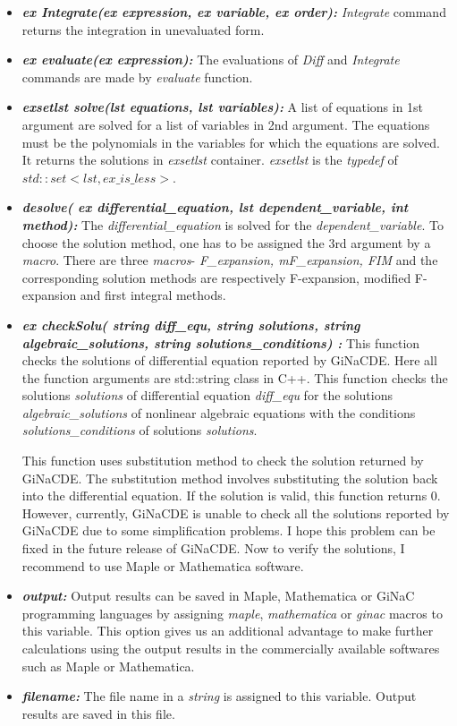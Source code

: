 \documentclass[prd,aps,floats,showkeys,nofootinbib,notitlepage]{revtex4-2}
\begin{document}
\begin{itemize}
		\item[] {\em \textbf{ex Integrate(ex expression, ex variable, ex order):}} {\em Integrate} command returns the integration in unevaluated form.
		
		\item[] {\em \textbf{ex evaluate(ex expression):}} The evaluations of {\em Diff} and {\em Integrate} commands are made by {\em evaluate} function.
		
		\item[] {\em \textbf{exsetlst solve(lst equations, lst variables):}} A list of equations in 1st argument are solved for a list of variables in 2nd argument. The equations must be the polynomials in the variables for which the equations are solved. It returns the solutions in {\em exsetlst} container. {\em exsetlst} is the {\em typedef} of ${ std::set< lst,ex\_is\_less>}$.  
		
		\item[] {\em \textbf{desolve( ex differential\_equation, lst dependent\_variable, int method):}} The {\em differential\_equation} is solved for the {\em dependent\_variable}. To choose the solution method, one has to be assigned the 3rd argument by a {\em macro}. There are three {\em macros}- {\em F\_expansion, mF\_expansion, FIM} and the corresponding solution methods are respectively F-expansion, modified F-expansion and first integral methods. 
		
		\item[] {\em \textbf{ex checkSolu( string diff\_equ, string solutions, string algebraic\_solutions, string solutions\_conditions)
		:}}  This function checks the solutions of differential equation reported by GiNaCDE. Here all the function arguments are std::string class in C++. This function checks the solutions \textit{solutions} of differential equation \textit{diff\_equ} for the solutions \textit{algebraic\_solutions} of nonlinear algebraic equations with the conditions \textit{solutions\_conditions} of solutions \textit{solutions}.
	
	   This function uses substitution method to check the solution returned by GiNaCDE. The substitution method involves substituting the solution back into the differential equation. If the solution is valid, this function returns $0$. However, currently, GiNaCDE is unable to check all the solutions reported by GiNaCDE due to some simplification problems. I hope this problem can be fixed in the future release of GiNaCDE. Now to verify the solutions, I recommend to use Maple or Mathematica software.
		
		\item[] {\em \textbf{output:}} Output results can be saved in Maple, Mathematica or GiNaC programming languages by assigning {\em maple}, {\em mathematica}
		 or {\em ginac} {macros} to this variable. This option gives us an additional advantage to make further calculations using the output results in the commercially available softwares such as {Maple} or {Mathematica}.
		
		\item[] {\em \textbf{filename:}} The file name in a {\em string} is assigned to this variable. Output results are saved in this file. 
	\end{itemize}
	
\end{document}
